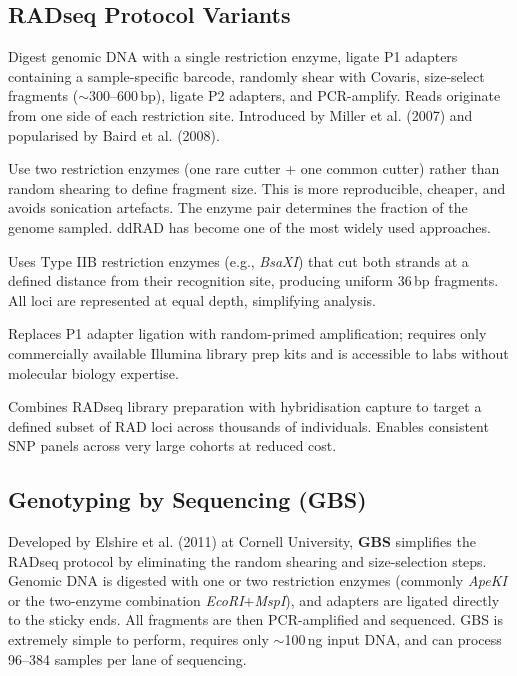 \subsection{RADseq Protocol Variants}
\label{subsec:radseq:variants}

\begin{description}[style=nextline]
  \item[Original RADseq] Digest genomic DNA with a single restriction enzyme, ligate P1 adapters containing a sample-specific barcode, randomly shear with Covaris, size-select fragments ($\sim$300--600\,bp), ligate P2 adapters, and PCR-amplify. Reads originate from one side of each restriction site. Introduced by Miller et al. (2007) and popularised by Baird et al. (2008).

  \item[Double-digest RADseq (ddRAD)] Use two restriction enzymes (one rare cutter + one common cutter) rather than random shearing to define fragment size. This is more reproducible, cheaper, and avoids sonication artefacts. The enzyme pair determines the fraction of the genome sampled. ddRAD has become one of the most widely used approaches.

  \item[2b-RAD] Uses Type IIB restriction enzymes (e.g., \textit{BsaXI}) that cut both strands at a defined distance from their recognition site, producing uniform 36\,bp fragments. All loci are represented at equal depth, simplifying analysis.

  \item[ezRAD] Replaces P1 adapter ligation with random-primed amplification; requires only commercially available Illumina library prep kits and is accessible to labs without molecular biology expertise.

  \item[rapture (RADcap)] Combines RADseq library preparation with hybridisation capture to target a defined subset of RAD loci across thousands of individuals. Enables consistent SNP panels across very large cohorts at reduced cost.
\end{description}

\subsection{Genotyping by Sequencing (GBS)}
\label{subsec:gbs}

Developed by Elshire et al. (2011) at Cornell University, \textbf{GBS} simplifies the RADseq protocol by eliminating the random shearing and size-selection steps. Genomic DNA is digested with one or two restriction enzymes (commonly \textit{ApeKI} or the two-enzyme combination \textit{EcoRI}+\textit{MspI}), and adapters are ligated directly to the sticky ends. All fragments are then PCR-amplified and sequenced. GBS is extremely simple to perform, requires only $\sim$100\,ng input DNA, and can process 96--384 samples per lane of sequencing.

